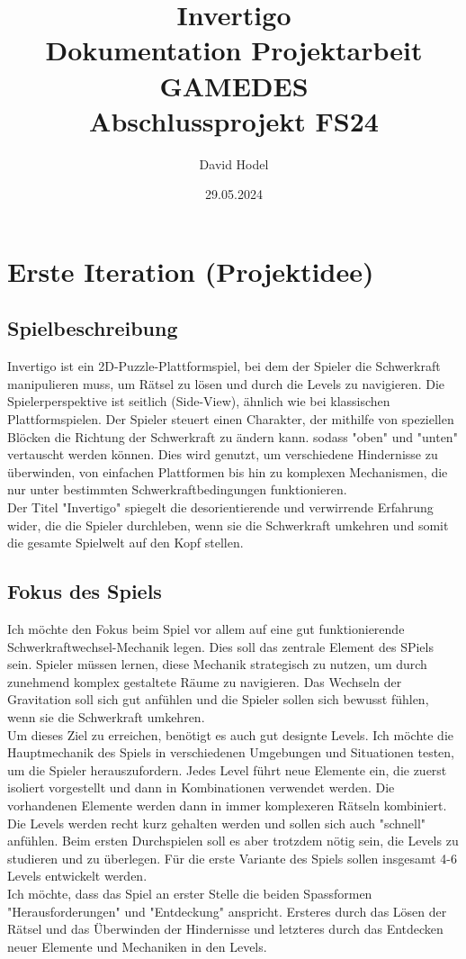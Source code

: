 \documentclass{article}
\title{%
Invertigo \\
\large Dokumentation Projektarbeit GAMEDES \\
  Abschlussprojekt FS24}
\author{David Hodel}
\date{29.05.2024}
\begin{document}
\maketitle
\newpage

\tableofcontents
\newpage

\section{Erste Iteration (Projektidee)}

\subsection{Spielbeschreibung}
Invertigo ist ein 2D-Puzzle-Plattformspiel, bei dem der Spieler die Schwerkraft manipulieren muss,
um Rätsel zu lösen und durch die Levels zu navigieren.
Die Spielerperspektive ist seitlich (Side-View), ähnlich wie bei klassischen Plattformspielen.
Der Spieler steuert einen Charakter, der mithilfe von speziellen Blöcken die Richtung der Schwerkraft zu ändern kann.
sodass "oben" und "unten" vertauscht werden können.
Dies wird genutzt, um verschiedene Hindernisse zu überwinden, von einfachen Plattformen bis hin zu komplexen Mechanismen,
die nur unter bestimmten Schwerkraftbedingungen funktionieren.
\\
Der Titel "Invertigo" spiegelt die desorientierende und verwirrende Erfahrung wider, die die Spieler durchleben,
wenn sie die Schwerkraft umkehren und somit die gesamte Spielwelt auf den Kopf stellen.

\subsection{Fokus des Spiels}

Ich möchte den Fokus beim Spiel vor allem auf eine gut funktionierende Schwerkraftwechsel-Mechanik legen. Dies soll das zentrale Element des SPiels sein.
Spieler müssen lernen, diese Mechanik strategisch zu nutzen, um durch zunehmend komplex gestaltete Räume zu navigieren. Das Wechseln der Gravitation soll sich gut
anfühlen und die Spieler sollen sich bewusst fühlen, wenn sie die Schwerkraft umkehren.
\\
Um dieses Ziel zu erreichen, benötigt es auch gut designte Levels. Ich möchte die Hauptmechanik des Spiels in verschiedenen Umgebungen und Situationen testen, um die Spieler
herauszufordern. Jedes Level führt neue Elemente ein, die zuerst isoliert vorgestellt und dann in Kombinationen verwendet werden. Die vorhandenen Elemente werden dann in immer komplexeren Rätseln kombiniert.
Die Levels werden recht kurz gehalten werden und sollen sich auch "schnell" anfühlen. Beim ersten Durchspielen soll es aber trotzdem nötig sein, die Levels zu studieren und zu überlegen.
Für die erste Variante des Spiels sollen insgesamt 4-6 Levels entwickelt werden.
\\
Ich möchte, dass das Spiel an erster Stelle die beiden Spassformen "Herausforderungen" und "Entdeckung" anspricht. Ersteres durch das Lösen der Rätsel und das Überwinden der Hindernisse und letzteres
durch das Entdecken neuer Elemente und Mechaniken in den Levels.
\end{document}
